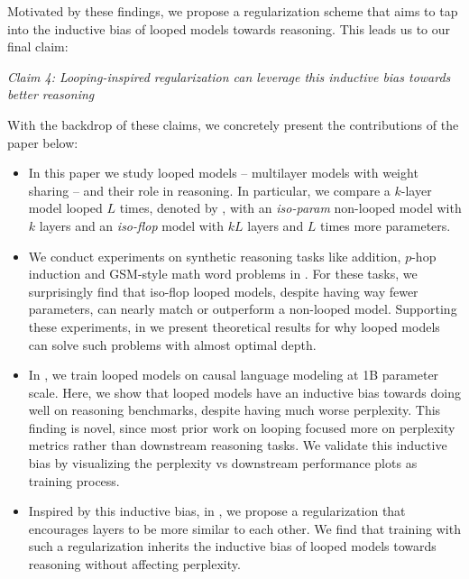 \fi


Motivated by these findings, we propose a regularization scheme that aims to tap into the inductive bias of looped models towards reasoning.
This leads us to our final claim:
\vspace{-0.05in}
\begin{center}
    \textit{Claim 4: Looping-inspired regularization can leverage this inductive bias towards better reasoning}
\end{center}
\vspace{-0.05in}

With the backdrop of these claims, we concretely present the contributions of the paper below:
\begin{itemize}
    \item In this paper we study looped models -- multilayer models with weight sharing -- and their role in reasoning. In particular, we compare a $k$-layer model looped $L$ times, denoted by , with an {\em iso-param}  non-looped model with $k$ layers and an {\em iso-flop}  model with $kL$ layers and $L$ times more parameters.
    \item We conduct experiments on synthetic reasoning tasks like addition, $p$-hop induction and GSM-style math word problems in . For these tasks, we surprisingly find that iso-flop looped models, despite having way fewer parameters, can nearly match or outperform a non-looped model. Supporting these experiments, in  we present theoretical results for why looped models can solve such problems with almost optimal depth.
    \item In , we train looped models on causal language modeling at 1B parameter scale. Here, we show that looped models have an inductive bias towards doing well on reasoning benchmarks, despite having much worse perplexity. This finding is novel, since most prior work on looping focused more on perplexity metrics rather than downstream reasoning tasks. We validate this inductive bias by visualizing the perplexity vs downstream performance plots as training process.
    \item Inspired by this inductive bias, in , we propose a regularization that encourages layers to be more similar to each other. We find that training with such a regularization inherits the inductive bias of looped models towards reasoning without affecting perplexity.
\end{itemize}
\vspace{-0.05in}





